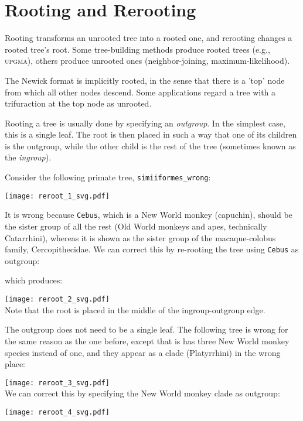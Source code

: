 
\section{Rooting and Rerooting}
\label{sct_reroot}

Rooting transforms an unrooted tree into a rooted one, and rerooting changes a rooted tree's root. Some tree-building methods produce rooted trees (e.g., \textsc{upgma}), others produce unrooted ones (neighbor-joining, maximum-likelihood). 

The Newick format is implicitly rooted, in the sense that there is a 'top' node from which all other nodes descend. Some applications regard a tree with a trifuraction at the top node as unrooted. 

Rooting a tree is usually done by specifying an \textit{outgroup}. In the simplest case, this is a single leaf. The root is then placed in such a way that one of its children is the outgroup, while the other child is the rest of the tree (sometimes known as the \textit{ingroup}). 

Consider the following primate tree, \texttt{simiiformes\_wrong}:

\texttt{[image: reroot\_1\_svg.pdf]}

\noindent{}It is wrong because \texttt{Cebus}, which is a New World monkey (capuchin), should be the sister group of all the rest (Old World monkeys and apes, technically Catarrhini), whereas it is shown as the sister group of the macaque-colobus family, Cercopithecidae. We can correct this by re-rooting the tree using \texttt{Cebus} as outgroup:

which produces:

\texttt{[image: reroot\_2\_svg.pdf]} \\

\noindent{}Note that the root is placed in the middle of the ingroup-outgroup
edge.

The outgroup does not need to be a single leaf. The following tree is
wrong for the same reason as the one before, except that is has three New World
monkey species instead of one, and they appear as a clade (Platyrrhini) in the
wrong place:

\texttt{[image: reroot\_3\_svg.pdf]} \\

\noindent{}We can correct this by specifying the New World monkey clade as outgroup:



\texttt{[image: reroot\_4\_svg.pdf]} \\

